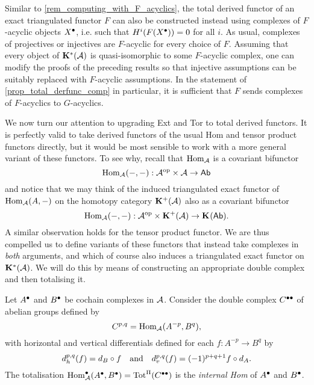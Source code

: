 \begin{remark}
  \label{rem_total_derfunc_computing_acyclics}
  Similar to \cref{rem_computing_with_F_acyclics}, the total derived
  functor of an exact triangulated functor $F$ can also be
  constructed instead using complexes of $F$-acyclic objects
  $\cochaincomp{X}$, i.e. such that $H^i(F(\cochaincomp{X})) = 0$ for all $i$.
  As usual, complexes of projectives or injectives are $F$-acyclic
  for every choice of $F$.
  Assuming that every object of $\homcat[*]{\abcat{A}}$ is
  quasi-isomorphic to some $F$-acyclic complex, one can modify the
  proofs of the preceding results so that injective assumptions can
  be suitably replaced with $F$-acyclic assumptions.
  In the statement of \cref{prop_total_derfunc_comp} in particular,
  it is sufficient that $F$ sends complexes of $F$-acyclics to $G$-acyclics.
\end{remark}

We now turn our attention to upgrading Ext and Tor to total derived functors.
It is perfectly valid to take derived functors of the usual Hom and
tensor product functors directly, but it would be most sensible to
work with a more general variant of these functors.
To see why, recall that $\Hom_{\abcat{A}}$ is a covariant bifunctor
\[
  \Hom_{\abcat{A}}(-, -): \op{\abcat{A}} \times \abcat{A} \to \Ab
\]
and notice that we may think of the induced triangulated exact
functor of $\Hom_{\abcat{A}}(A, -)$ on the homotopy category
$\homcat[+]{\abcat{A}}$ also as a covariant bifunctor
\[
  \Hom_{\abcat{A}}(-, -): \op{\abcat{A}} \times \homcat[+]{\abcat{A}}
  \to \homcat{\Ab}.
\]
A similar observation holds for the tensor product functor.
We are thus compelled us to define variants of these functors that
instead take complexes in \emph{both} arguments, and which of course
also induces a triangulated exact functor on $\homcat[*]{\abcat{A}}$.
We will do this by means of constructing an appropriate double
complex and then totalising it.

\begin{definition}
  Let $\cochaincomp{A}$ and $\cochaincomp{B}$ be cochain complexes in
  $\abcat{A}$.
  Consider the double complex $\cochainbicomp{C}$ of abelian groups defined by
  \[
    C^{p, q} = \Hom_{\abcat{A}}(A^{-p}, B^q),
  \]
  with horizontal and vertical differentials defined for each $f:
  A^{-p} \to B^q$ by
  \[
    d_h^{p, q}(f) = d_B \circ f
    \mathand
    d_v^{p, q}(f) = (-1)^{p + q + 1} f \circ d_A.
  \]
  The totalisation $\Hom^{\bullet}_{\abcat{A}}(\cochaincomp{A},
  \cochaincomp{B}) = \totprodcomp{\cochainbicomp{C}}$ is the
  \emph{internal Hom} of $\cochaincomp{A}$ and $\cochaincomp{B}$.
\end{definition}

